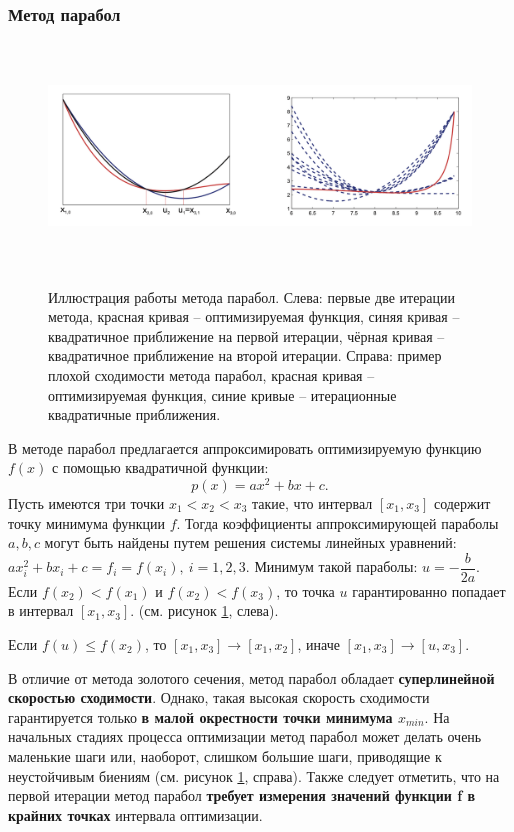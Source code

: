 \subsubsection{Метод парабол}
\begin{figure}[hbt!]
    \centering
    \includegraphics[width=16cm, height=6cm]{images/im223.png}
    \label{ris:im223}
    \caption{ Иллюстрация работы метода парабол. Слева: первые две итерации метода, красная кривая – оптимизируемая функция, синяя кривая – квадратичное приближение на первой итерации, чёрная кривая – квадратичное приближение на второй итерации. Справа: пример плохой сходимости метода парабол, красная кривая – оптимизируемая функция, синие кривые – итерационные квадратичные приближения.}
\end{figure}
В методе парабол предлагается аппроксимировать оптимизируемую функцию $f(x)$ с помощью квадратичной функции:
$$p(x)=ax^2 +bx+c.$$
Пусть имеются три точки $x_1 < x_2 < x_3$ такие, что интервал $[x_1,x_3]$ содержит точку минимума функции $f$. Тогда коэффициенты аппроксимирующей параболы $a, b, c$ могут быть найдены путем решения системы линейных уравнений:
$a x^2_i + bx_i + c = f_i = f ( x_i ) , \ i = 1 , 2 , 3 .$
Минимум такой параболы: $u = -\dfrac{b}{2a}$.
\newline \newline
Если $f(x_2) < f(x_1)$ и $f(x_2) < f(x_3)$, то точка $u$ гарантированно попадает в интервал $[x_1,x_3]$. (см. рисунок \ref{ris:im223}, слева).
\begin{center}
    Если $f(u)\leq f(x_2)$, то $[x_1, x_3] \to [x_1, x_2]$, иначе $[x_1, x_3] \to [u, x_3]$.
\end{center}
В отличие от метода золотого сечения, метод парабол обладает \textbf{суперлинейной скоростью сходимости}. Однако, такая высокая скорость сходимости гарантируется только \textbf{в малой окрестности точки минимума $x_{min}$}. На начальных стадиях процесса оптимизации метод парабол может делать очень маленькие шаги или, наоборот, слишком большие шаги, приводящие к неустойчивым биениям (см. рисунок \ref{ris:im223}, справа). Также следует отметить, что на первой итерации метод парабол \textbf{требует измерения значений функции f в крайних точках} интервала оптимизации.

